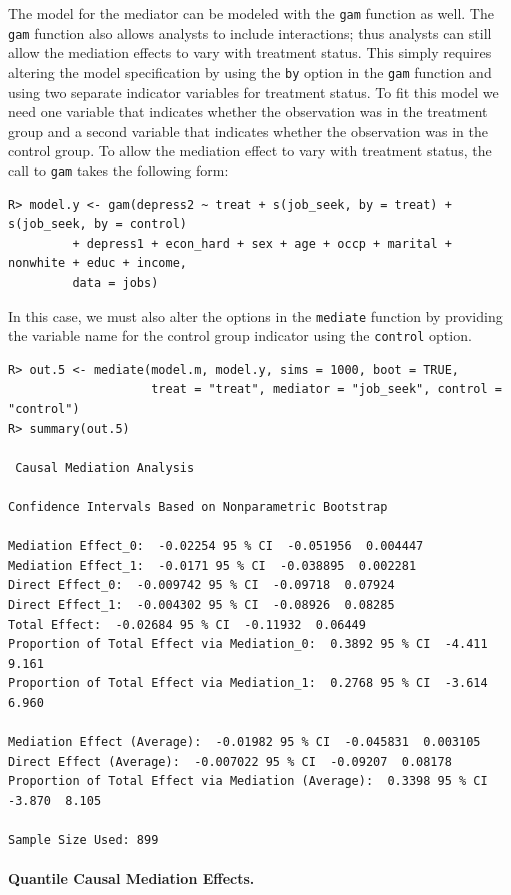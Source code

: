 \documentclass[11pt,letterpaper]{article}
\theoremstyle{plain}
\begin{document}
The model for the mediator can be modeled with the \texttt{gam}
function as well.  The \texttt{gam} function also allows analysts to
include interactions; thus analysts can still allow the mediation
effects to vary with treatment status.  This simply requires altering
the model specification by using the \texttt{by} option in the
\texttt{gam} function and using two separate indicator variables for
treatment status.  To fit this model we need one variable that
indicates whether the observation was in the treatment group and a
second variable that indicates whether the observation was in the
control group.  To allow the mediation effect to vary with treatment
status, the call to \texttt{gam} takes the following form:
\begin{verbatim}
R> model.y <- gam(depress2 ~ treat + s(job_seek, by = treat) + s(job_seek, by = control)
         + depress1 + econ_hard + sex + age + occp + marital + nonwhite + educ + income,
         data = jobs)
\end{verbatim}
In this case, we must also alter the options in the \texttt{mediate}
function by providing the variable
name for the control group indicator using the \texttt{control} option.
\begin{verbatim}
R> out.5 <- mediate(model.m, model.y, sims = 1000, boot = TRUE,
                    treat = "treat", mediator = "job_seek", control = "control")
R> summary(out.5)

 Causal Mediation Analysis 

Confidence Intervals Based on Nonparametric Bootstrap

Mediation Effect_0:  -0.02254 95 % CI  -0.051956  0.004447 
Mediation Effect_1:  -0.0171 95 % CI  -0.038895  0.002281 
Direct Effect_0:  -0.009742 95 % CI  -0.09718  0.07924 
Direct Effect_1:  -0.004302 95 % CI  -0.08926  0.08285 
Total Effect:  -0.02684 95 % CI  -0.11932  0.06449 
Proportion of Total Effect via Mediation_0:  0.3892 95 % CI  -4.411  9.161 
Proportion of Total Effect via Mediation_1:  0.2768 95 % CI  -3.614  6.960 

Mediation Effect (Average):  -0.01982 95 % CI  -0.045831  0.003105 
Direct Effect (Average):  -0.007022 95 % CI  -0.09207  0.08178 
Proportion of Total Effect via Mediation (Average):  0.3398 95 % CI  -3.870  8.105 

Sample Size Used: 899 
\end{verbatim}

\paragraph{Quantile Causal Mediation Effects.}
\end{document}
